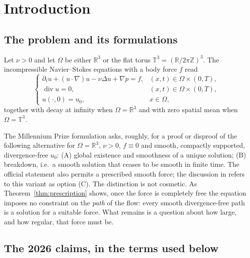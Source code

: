 \documentclass[11pt]{article}
\theoremstyle{remark}
\newcommand{\R}{\mathbb{R}}
\newcommand{\T}{\mathbb{T}}
\newcommand{\Div}{\operatorname{div}}
\begin{document}
\tableofcontents

\section{Introduction}\label{sec:intro}

\subsection{The problem and its formulations}

Let $\nu>0$ and let $\Omega$ be either $\R^3$ or the flat torus
$\T^3=(\R/2\pi\mathbb{Z})^3$. The incompressible Navier--Stokes equations with a body force
$f$ read
\begin{equation}\label{eq:NS}
\begin{cases}
\partial_t u+(u\cdot\nabla)u-\nu\Delta u+\nabla p=f, & (x,t)\in\Omega\times(0,T),\\
\Div u=0, & (x,t)\in\Omega\times(0,T),\\
u(\cdot,0)=u_0, & x\in\Omega,
\end{cases}
\end{equation}
together with decay at infinity when $\Omega=\R^3$ and with zero spatial mean when
$\Omega=\T^3$.

The Millennium Prize formulation \cite{Fefferman2000} asks, roughly, for a proof or disproof
of the following alternative for $\Omega=\R^3$, $\nu>0$, $f\equiv0$ and smooth, compactly
supported, divergence-free $u_0$: (A) global existence and smoothness of a unique solution;
(B) breakdown, i.e.\ a smooth solution that ceases to be smooth in finite time. The official
statement also permits a prescribed smooth force; the discussion in \cite{SciAm2026} refers to
this variant as option (C). The distinction is not cosmetic. As
Theorem~\ref{thm:prescription} shows, once the force is completely free the equation imposes
no constraint on the \emph{path} of the flow: every smooth divergence-free path is a solution
for a suitable force. What remains is a question about how large, and how regular, that force
must be.

\subsection{The 2026 claims, in the terms used below}
\end{document}
